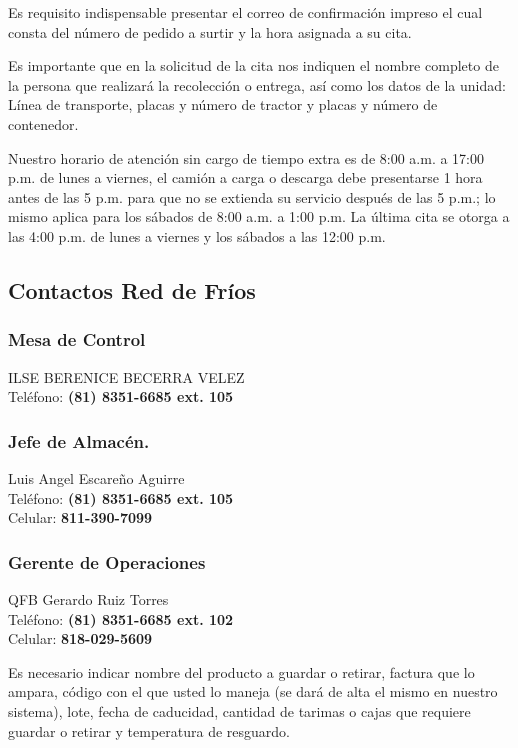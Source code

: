 Es requisito indispensable presentar el correo de confirmación impreso el cual consta del número de pedido a surtir y la hora asignada a su cita.

Es importante que en la solicitud de la cita nos indiquen el nombre completo de la persona que realizará la recolección o entrega, así como los datos de la unidad: Línea de transporte, placas y número de tractor y placas y número de contenedor.

Nuestro horario de atención sin cargo de tiempo extra es de 8:00 a.m. a 17:00 p.m. de lunes a viernes, el camión a carga o descarga debe presentarse 1 hora antes de las 5 p.m. para que no se extienda su servicio después de las 5 p.m.; lo mismo aplica para los sábados de 8:00 a.m. a 1:00 p.m. La última cita se otorga a las 4:00 p.m. de lunes a viernes y los sábados a las 12:00 p.m.

\subsection{Contactos Red de Fríos}

\subsubsection*{Mesa de Control} %
ILSE BERENICE BECERRA VELEZ\\
Teléfono: \textbf{(81) 8351-6685 ext. 105}\\

\subsubsection*{Jefe de Almacén.}
Luis Angel Escareño Aguirre\\
Teléfono: \textbf{(81) 8351-6685 ext. 105}\\
Celular: \textbf{811-390-7099}\\

\subsubsection*{Gerente de Operaciones}
QFB Gerardo Ruiz Torres\\
Teléfono: \textbf{(81) 8351-6685 ext. 102}\\
Celular: \textbf{818-029-5609}\\

Es necesario indicar nombre del producto a guardar o retirar, factura que lo ampara, código con el que usted lo maneja (se dará de alta el mismo en nuestro sistema), lote, fecha de caducidad, cantidad de tarimas o cajas que requiere guardar o retirar y temperatura de resguardo.


